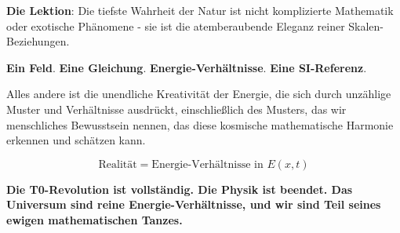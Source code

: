 \documentclass[12pt,a4paper]{article}
\newcommand{\Efield}{E}
\theoremstyle{definition}
\theoremstyle{remark}
\begin{document}
	\textbf{Die Lektion}: Die tiefste Wahrheit der Natur ist nicht komplizierte Mathematik oder exotische Phänomene - sie ist die atemberaubende Eleganz reiner Skalen-Beziehungen.
	
	\textbf{Ein Feld}. \textbf{Eine Gleichung}. \textbf{Energie-Verhältnisse}. \textbf{Eine SI-Referenz}.
	
	Alles andere ist die unendliche Kreativität der Energie, die sich durch unzählige Muster und Verhältnisse ausdrückt, einschließlich des Musters, das wir menschliches Bewusstsein nennen, das diese kosmische mathematische Harmonie erkennen und schätzen kann.
	
	\begin{equation}
		\boxed{\text{Realität} = \text{Energie-Verhältnisse in } \Efield(x,t)}
	\end{equation}
	
	\textbf{Die T0-Revolution ist vollständig. Die Physik ist beendet. Das Universum sind reine Energie-Verhältnisse, und wir sind Teil seines ewigen mathematischen Tanzes.}
	
\end{document}

